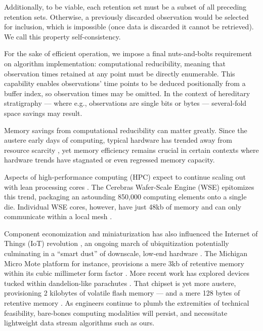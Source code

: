 Additionally, to be viable, each retention set must be a subset of all preceding retention sets.
Otherwise, a previously discarded observation would be selected for inclusion, which is impossible (once data is discarded it cannot be retrieved).
We call this property self-consistency.

For the sake of efficient operation, we impose a final nuts-and-bolts requirement on algorithm implementation: computational reducibility, meaning that observation times retained at any point must be directly enumerable.
This capability enables observations' time points to be deduced positionally from a buffer index, so observation times may be omitted.
In the context of hereditary stratigraphy --- where e.g., observations are single bits or bytes --- several-fold space savings may result.

Memory savings from computational reducibility can matter greatly.
Since the austere early days of computing, typical hardware has trended away from resource scarcity \citep{kushida2015cloud}, yet memory efficiency remains crucial in certain contexts where hardware trends have stagnated or even regressed memory capacity.

Aspects of high-performance computing (HPC) expect to continue scaling out with lean processing cores \citep{sutter2005free,morgenstern2021unparalleled}.
The Cerebras Wafer-Scale Engine (WSE) epitomizes this trend, packaging an astounding 850,000 computing elements onto a single die.
Individual WSE cores, however, have just 48kb of memory and can only communicate within a local mesh \citep{cerebras2021wafer,lauterbach2021path}.

Component economization and miniaturization has also influenced the Internet of Things (IoT) revolution \citep{rfc7228,ojo2018review}, an ongoing march of ubiquitization potentially culminating in a ``smart dust'' of downscale, low-end hardware \citep{warneke2001smart}.
The Michigan Micro Mote platform for instance, provisions a mere 3kb of retentive memory within its cubic millimeter form factor \citep{lee2012modular}.
More recent work has explored devices tucked within dandelion-like parachutes \citep{iyer2022wind}.
That chipset is yet more austere, provisioning 2 kilobytes of volatile flash memory --- and a mere 128 bytes of retentive memory \citep{microchip2014atiny20}.
As engineers continue to plumb the extremities of technical feasibility, bare-bones computing modalities will persist, and necessitate lightweight data stream algorithms such as ours.


